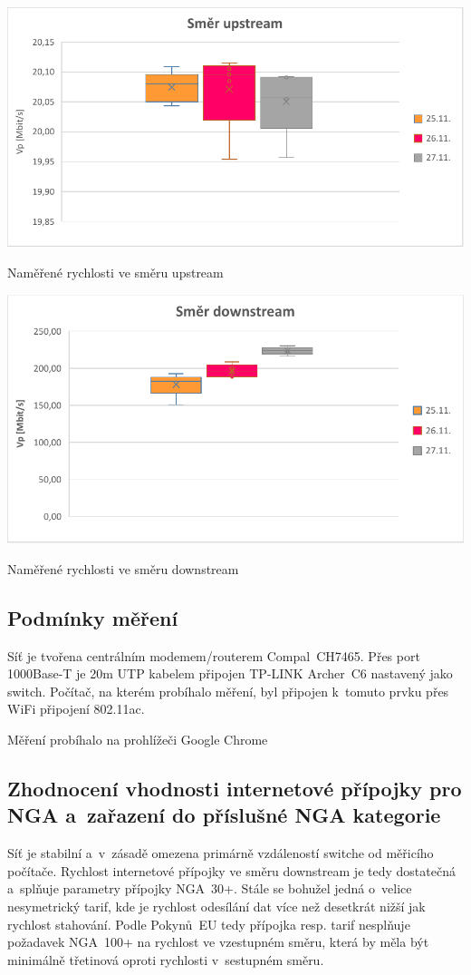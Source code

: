 \documentclass[a4paper,12pt]{article}   %
\begin{document}
\begin{graf}[hbtp]
  \centering
  \includegraphics[width = .6\textwidth]{tsi_uplink.pdf}
  \caption{Naměřené rychlosti ve směru upstream}
  \label{fig:up}
\end{graf}

\begin{graf}[hbtp]
  \centering
  \includegraphics[width = .6\textwidth]{tsi_downlink.pdf}
  \caption{Naměřené rychlosti ve směru downstream}
  \label{fig:down}
\end{graf}


\subsection*{Podmínky měření}
Síť je tvořena centrálním modemem/routerem Compal~CH7465. Přes port 1000Base-T je 20m UTP kabelem připojen TP-LINK Archer~C6 nastavený jako switch. Počítač, na kterém probíhalo měření, byl připojen k~tomuto prvku přes WiFi připojení 802.11ac.

Měření probíhalo na prohlížeči Google Chrome


\subsection*{Zhodnocení vhodnosti internetové přípojky pro NGA a~zařazení do příslušné NGA kategorie}
Síť je stabilní a~v~zásadě omezena primárně vzdáleností switche od měřicího počítače. Rychlost internetové přípojky ve směru downstream je tedy dostatečná a~splňuje parametry přípojky NGA~30+. Stále se bohužel jedná o~velice nesymetrický tarif, kde je rychlost odesílání dat více než desetkrát nižší jak rychlost stahování. Podle Pokynů~EU tedy přípojka resp. tarif nesplňuje požadavek NGA~100+ na rychlost ve vzestupném směru, která by měla být minimálně třetinová oproti rychlosti v~sestupném směru.
\end{document}
